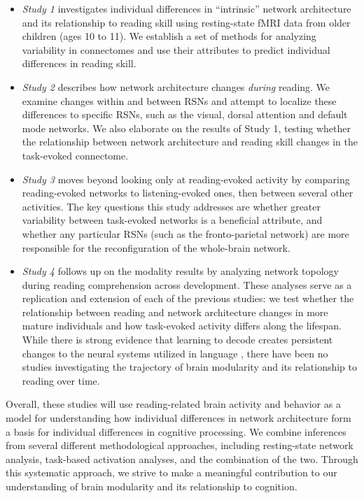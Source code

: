 \begin{itemize}

    \item \textit{Study 1} investigates individual differences in ``intrinsic'' network architecture and its relationship to reading skill using resting-state fMRI data from older children (ages 10 to 11). We establish a set of methods for analyzing variability in connectomes and use their attributes to predict individual differences in reading skill. 

    \item \textit{Study 2} describes how network architecture changes \textit{during} reading. We examine changes within and between RSNs and attempt to localize these differences to specific RSNs, such as the visual, dorsal attention and default mode networks. We also elaborate on the results of Study 1, testing whether the relationship between network architecture and reading skill changes in the task-evoked connectome. 

    \item \textit{Study 3} moves beyond looking only at reading-evoked activity by  comparing reading-evoked networks to listening-evoked ones, then between several other activities. The key questions this study addresses are whether greater variability between task-evoked networks is a beneficial attribute, and whether any particular RSNs (such as the fronto-parietal network) are more responsible for the reconfiguration of the whole-brain network.

    \item \textit{Study 4} follows up on the modality results by analyzing network topology during reading comprehension across development. These analyses serve as a replication and extension of each of the previous studies: we test whether the relationship between reading and network architecture changes in more mature individuals and how task-evoked activity differs along the lifespan. While there is strong evidence that learning to decode creates persistent changes to the neural systems utilized in language \citep{Schlaggar2007}, there have been no studies investigating the trajectory of brain modularity and its relationship to reading over time.

\end{itemize}

Overall, these studies will use reading-related brain activity and behavior as a model for understanding how individual differences in network architecture form a basis for individual differences in cognitive processing. We combine inferences from several different methodological approaches, including resting-state network analysis, task-based activation analyses, and the combination of the two. Through this systematic approach, we strive to make a meaningful contribution to our understanding of brain modularity and its relationship to cognition.